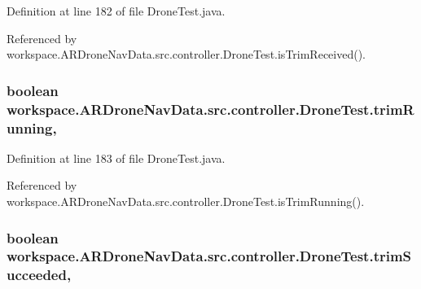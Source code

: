 Definition at line 182 of file Drone\+Test.\+java.



Referenced by workspace.\+A\+R\+Drone\+Nav\+Data.\+src.\+controller.\+Drone\+Test.\+is\+Trim\+Received().

\hypertarget{classworkspace_1_1_a_r_drone_nav_data_1_1src_1_1controller_1_1_drone_test_a9867dd8d9078528234f16bc614a4c802}{}
\subsubsection[{trim\+Running}]{\setlength{\rightskip}{0pt plus 5cm}boolean workspace.\+A\+R\+Drone\+Nav\+Data.\+src.\+controller.\+Drone\+Test.\+trim\+Running\hspace{0.3cm}{\ttfamily [static]}, {\ttfamily [protected]}}\label{classworkspace_1_1_a_r_drone_nav_data_1_1src_1_1controller_1_1_drone_test_a9867dd8d9078528234f16bc614a4c802}


Definition at line 183 of file Drone\+Test.\+java.



Referenced by workspace.\+A\+R\+Drone\+Nav\+Data.\+src.\+controller.\+Drone\+Test.\+is\+Trim\+Running().

\hypertarget{classworkspace_1_1_a_r_drone_nav_data_1_1src_1_1controller_1_1_drone_test_aa4cc49528d13ce11544c889e57989b87}{}
\subsubsection[{trim\+Succeeded}]{\setlength{\rightskip}{0pt plus 5cm}boolean workspace.\+A\+R\+Drone\+Nav\+Data.\+src.\+controller.\+Drone\+Test.\+trim\+Succeeded\hspace{0.3cm}{\ttfamily [static]}, {\ttfamily [protected]}}\label{classworkspace_1_1_a_r_drone_nav_data_1_1src_1_1controller_1_1_drone_test_aa4cc49528d13ce11544c889e57989b87}


